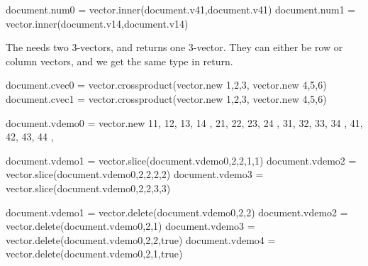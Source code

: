 \startbuffer
\startluacode
document.num0 = vector.inner(document.v41,document.v41)
document.num1 = vector.inner(document.v14,document.v14)
\stopluacode
\stopbuffer

\typebuffer[option=TEX] \getbuffer

\startlinecorrection
{} {}
    {} {}
\stopcombination
\stoplinecorrection

The  needs two 3-vectors, and returns one 3-vector. They can
either be row or column vectors, and we get the same type in return.

\startbuffer
\startluacode
document.cvec0 = vector.crossproduct(vector.new {{1,2,3}},     vector.new {{4,5,6}})
document.cvec1 = vector.crossproduct(vector.new {{1},{2},{3}}, vector.new {{4},{5},{6}})
\stopluacode
\stopbuffer

\typebuffer[option=TEX] \getbuffer

\startlinecorrection
{} {}
    {} {}
\stopcombination
\stoplinecorrection


\startbuffer
\startluacode
document.vdemo0 = vector.new {
    { 11, 12, 13, 14 },
    { 21, 22, 23, 24 },
    { 31, 32, 33, 34 },
    { 41, 42, 43, 44 },
}

document.vdemo1 = vector.slice(document.vdemo0,2,2,1,1)
document.vdemo2 = vector.slice(document.vdemo0,2,2,2,2)
document.vdemo3 = vector.slice(document.vdemo0,2,2,3,3)
\stopluacode
\stopbuffer

\typebuffer[option=TEX] \getbuffer

\startlinecorrection
{} {}
    {} {}
    {} {}
    {} {}
\stopcombination
\stoplinecorrection

\startbuffer
\startluacode
document.vdemo1 = vector.delete(document.vdemo0,2,2)
document.vdemo2 = vector.delete(document.vdemo0,2,1)
document.vdemo3 = vector.delete(document.vdemo0,2,2,true)
document.vdemo4 = vector.delete(document.vdemo0,2,1,true)
\stopluacode
\stopbuffer

